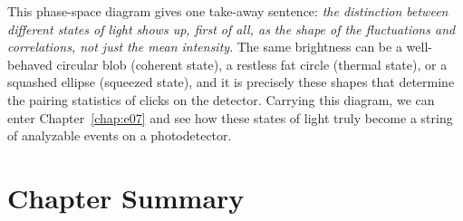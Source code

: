 This phase-space diagram gives one take-away sentence: \emph{the distinction between different states of light shows up, first of all, as the shape of the fluctuations and correlations, not just the mean intensity}. The same brightness can be a well-behaved circular blob (coherent state), a restless fat circle (thermal state), or a squashed ellipse (squeezed state), and it is precisely these shapes that determine the pairing statistics of clicks on the detector. Carrying this diagram, we can enter Chapter~\ref{chap:e07} and see how these states of light truly become a string of analyzable events on a photodetector.

\section{Chapter Summary}
\label{sec:e06-summary}

